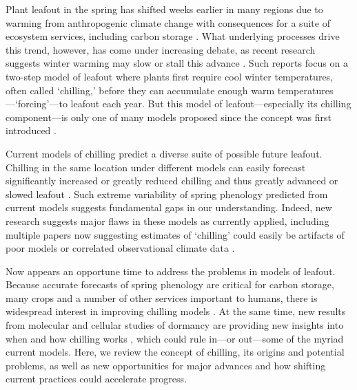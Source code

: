 \documentclass[11pt]{article}
\begin{document}
Plant leafout in the spring has shifted weeks earlier in many regions due to warming from anthropogenic climate change with consequences for a suite of ecosystem services, including carbon storage \citep{keenan2014net,ipcc2022}.  What underlying processes drive this trend, however, has come under increasing debate, as recent research suggests winter warming may slow or stall this advance \citep{fu2015,piao2017}. Such reports focus on a two-step model of leafout where plants first require cool winter temperatures, often called `chilling,' before they can accumulate enough warm temperatures---`forcing'---to leafout each year. But this model of leafout---especially its chilling component---is only one of many models proposed since the concept was first introduced \citep[at least 30 models are used today, see][]{basler2016evaluating,hufkens2018integrated}. 

Current models of chilling predict a diverse suite of possible future leafout. Chilling in the same location under different models can easily forecast significantly increased or greatly reduced chilling and thus greatly advanced or slowed leafout \citep{guy2014,chuine2016}. Such extreme variability of spring phenology predicted from current models suggests fundamental gaps in our understanding. Indeed, new research suggests major flaws in these models as currently applied, including multiple papers now suggesting estimates of `chilling' could easily be artifacts of poor models or correlated observational climate data \citep{decsens,gao2024}. 

Now appears an opportune time to address the problems in models of leafout. Because accurate forecasts of spring phenology are critical for carbon storage, many crops and a number of other services important to humans, there is widespread interest in improving chilling models \citep{Luedeling2015Acta,chuine2016}. At the same time, new results from molecular and cellular studies of dormancy are providing new insights into when and how chilling works \citep{pan2023epigenetic,zhu2021cold}, which could rule in---or out---some of the myriad current models. 
Here, we review the concept of chilling, its origins and potential problems, as well as new opportunities for major advances and how shifting current practices could accelerate progress. %
\end{document}
